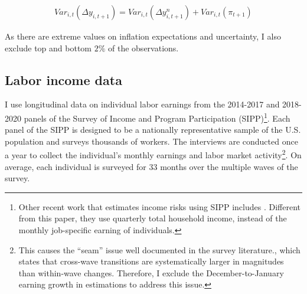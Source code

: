 \begin{eqnarray}
Var_{i,t}(\Delta y_{i,t+1}) = Var_{i,t}(\Delta y^n_{i,t+1}) + Var_{i,t}(\pi_{t+1})
\end{eqnarray}

As there are extreme values on inflation
expectations and uncertainty, I also exclude top and bottom \(2\%\) of
the observations. 

\subsection{Labor income data}

I use longitudinal data on individual labor earnings from the 2014-2017 and 2018-2020 panels of the Survey of Income and Program Participation (SIPP)\footnote{Other recent work that estimates income risks using SIPP includes \cite{bayer2019precautionary}. Different from this paper, they use quarterly total household income, instead of the monthly job-specific earning of individuals.}. Each panel of the SIPP is designed to be a nationally representative sample of the U.S. population and surveys thousands of workers. The interviews are conducted once a year to collect the individual's monthly earnings and labor market activity\footnote{This causes the ``seam'' issue well documented in the survey literature\citep{moore2008seam}., which states that cross-wave transitions are systematically larger in magnitudes than within-wave changes. Therefore, I exclude the December-to-January earning growth in estimations to address this issue.}. On average, each individual is surveyed for 33 months over the multiple waves of the survey.

